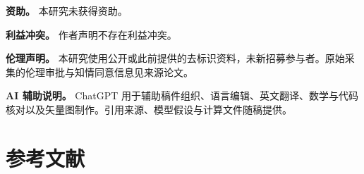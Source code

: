 \documentclass[11pt,a4paper]{article}
\begin{document}
\textbf{资助。} 本研究未获得资助。

\textbf{利益冲突。} 作者声明不存在利益冲突。

\textbf{伦理声明。}
本研究使用公开或此前提供的去标识资料，未新招募参与者。原始采集的伦理审批与知情同意信息见来源论文。

\textbf{AI 辅助说明。} ChatGPT
用于辅助稿件组织、语言编辑、英文翻译、数学与代码核对以及矢量图制作。引用来源、模型假设与计算文件随稿提供。

\FloatBarrier


\section{参考文献}\label{ux53c2ux8003ux6587ux732e}

\fontsize{9}{11}\selectfont
\setlength{\parskip}{2pt}
\end{document}
